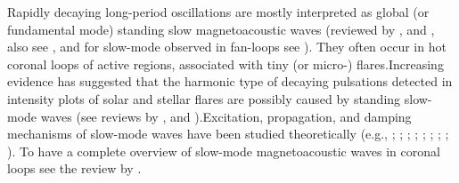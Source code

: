 \documentclass[oneside,onecolumn]{article}
\begin{document}
Rapidly decaying long-period oscillations are mostly interpreted as global (or fundamental mode) standing slow magnetoacoustic waves (reviewed by \citet{Liu2014}, and \citet{ref:Wang2011}, also see \citet{Ofman2002}, and for slow-mode observed in fan-loops see \citet{ref:Pant2017}). They often occur in hot coronal loops of active regions, associated with tiny (or micro-) flares.Increasing evidence has suggested that the harmonic type of decaying pulsations detected in intensity plots of solar and stellar flares are possibly caused by standing slow-mode waves (see reviews by \citet{ref:VanDoorsselaere2016}, and \citet{ref:McLaughlin2018}).Excitation, propagation, and damping mechanisms of slow-mode waves have been studied theoretically (e.g., \citet{ref:Wang2007}; \citet{ref:Wang2015}; \citet{ref:Jess2016}; \citet{ref:Nakariakov2017}; \citet{ref:Nistico2017}; \citet{ref:Kolotkov2019}; \citet{ref:Krishna2019}; \citet{ref:Reale2019}; \citet{ref:WangO2019}). To have a complete overview of slow-mode magnetoacoustic waves in coronal loops see the review by \citet{ref:Wang2021}. 
\end{document}
